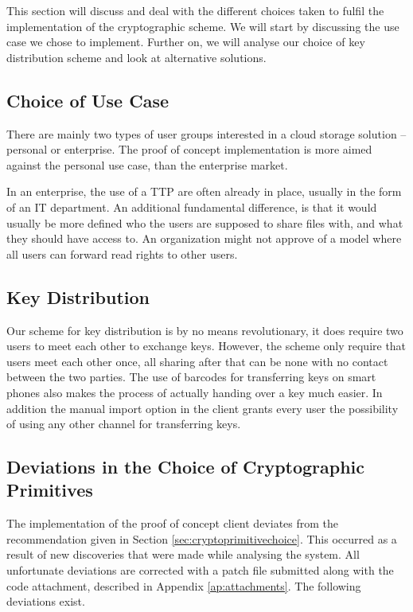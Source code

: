 \documentclass[pdftex,english,10pt,b5paper,twoside]{book}
\begin{document}
This section will discuss and deal with the different choices taken to fulfil
the implementation of the cryptographic scheme. We will start by discussing the
use case we chose to implement. Further on, we will analyse our choice of key
distribution scheme and look at alternative solutions.

\subsection{Choice of Use Case}

There are mainly two types of user groups interested in a cloud storage
solution -- personal or enterprise. The proof of concept implementation is more
aimed against the personal use case, than the enterprise market.

In an enterprise, the use of a \ac{TTP} are often already in place, usually in
the form of an IT department. An additional fundamental difference, is that it
would usually be more defined who the users are supposed to share files with,
and what they should have access to. An organization might not approve of a
model where all users can forward read rights to other users.

\subsection{Key Distribution}

Our scheme for key distribution is by no means revolutionary, it does require
two users to meet each other to exchange keys. However, the scheme only require
that users meet each other once, all sharing after that can be none with no
contact between the two parties. The use of barcodes for transferring keys on
smart phones also makes the process of actually handing over a key much easier.
In addition the manual import option in the client grants every user the
possibility of using any other channel for transferring keys.

\subsection{Deviations in the Choice of Cryptographic Primitives}

The implementation of the proof of concept client deviates from the
recommendation given in Section \ref{sec:cryptoprimitivechoice}.  This occurred
as a result of new discoveries that were made while analysing the system. All
unfortunate deviations are corrected with a patch file submitted along with the
code attachment, described in Appendix \ref{ap:attachments}. The following
deviations exist.
\end{document}

